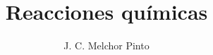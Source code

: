 \documentclass[12pt,addpoints,answers]{guia}
\title{Reacciones químicas}
\author{J. C. Melchor Pinto}
\begin{document}
\pagestyle{headandfoot}

\INFO
\printanswers
\begin{multicols}{2}
    
\end{multicols}



\end{document}
